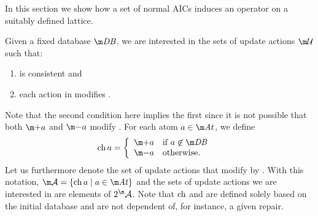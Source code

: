 In this section we show how a set of normal AICs induces an operator on a suitably defined lattice.


Given a fixed database $\db$, we are interested in the sets of update actions $\UU$ such that:
\begin{enumerate}
\item \UU is consistent and 
\item each action in \UU modifies \db.
\end{enumerate}
Note that the second condition here implies the first since it is not possible that both $\add a$ and $\remove a$ modify \db.
For each atom $a\in\atoms$, we define 
 \begin{align*}
 \change a &= \left\{\begin{array}{ll}
                      \add a & \text{if } a \not \in \db\\
                      \remove a & \text {otherwise.}
                     \end{array}\right.
\end{align*}
Let us furthermore denote the set of update actions that modify \db by \acts. 
With this notation, $\acts = \{\change a \mid a \in \atoms\}$ and the sets of update actions we are interested in are elements of $2^\acts$. 
Note that $\operatorname{ch}$ and \acts are defined solely based on the initial database \db and are not dependent of, for instance, a given repair.






